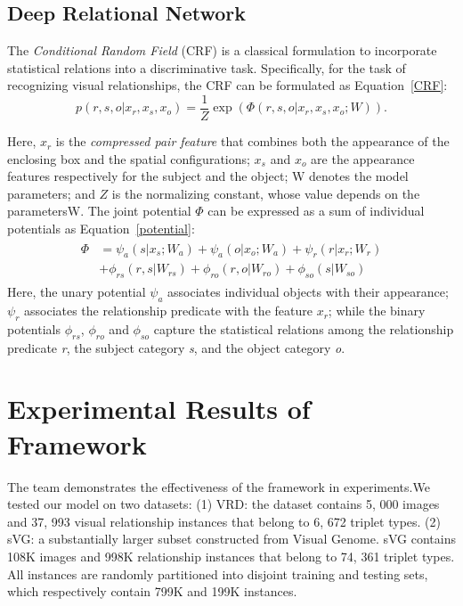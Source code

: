 \documentclass[10pt,twocolumn,letterpaper]{article}
\begin{document}
\subsection{Deep Relational Network}

The \emph{Conditional Random Field} (CRF) is a classical formulation to incorporate statistical relations into a discriminative task. Specifically, for the task of recognizing visual relationships, the CRF can be formulated as Equation~\ref{CRF}:
\begin{equation}
p(r,s,o|x_r,x_s,x_o)=\frac{1}{Z} \exp(\Phi(r,s,o|x_r,x_s,x_o;W)).     \label{CRF}
\end{equation}

Here, $x_r$ is the \emph{compressed pair feature} that combines both the appearance of the enclosing box and the spatial configurations; $x_s$ and $x_o$ are the appearance features respectively for the subject and the object; W denotes the model parameters; and $Z$ is the normalizing constant, whose value depends on the parametersW. The joint potential $\Phi$ can be expressed as a sum of individual potentials as Equation~\ref{potential}:
\begin{equation}
\begin{aligned}
\begin{split}
\Phi&=\psi_a(s|x_s;W_a)+\psi_a(o|x_o;W_a)+\psi_r(r|x_r;W_r)\\
&+\phi_{rs}(r,s|W_{rs})+\phi_{ro}(r,o|W_{ro})+\phi_{so}(s|W_{so})    \label{potential}
\end{split} 
\end{aligned}
\end{equation}
Here, the unary potential $\psi_a$ associates individual objects with their appearance; $\psi_r$ associates the relationship predicate with the feature $x_r$; while the binary potentials $\phi_{rs}$, $\phi_{ro}$ and $\phi_{so}$ capture the statistical relations among the relationship predicate \emph{r}, the subject category \emph{s}, and the object category \emph{o}.

\section{Experimental Results of Framework}

The team demonstrates the effectiveness of the framework in experiments.We tested our model on two datasets: (1) VRD: the dataset contains 5, 000 images and 37, 993 visual relationship instances that belong to 6, 672 triplet types. (2) sVG: a substantially larger subset constructed from Visual Genome. sVG contains 108K images and 998K relationship instances that belong to 74, 361 triplet types. All instances are randomly partitioned into disjoint training and testing sets, which respectively contain 799K and 199K instances.
\end{document}
